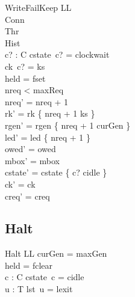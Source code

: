 \documentclass[a4paper,10pt,fleqn]{article}
\begin{document}
\begin{schema}{WriteFailKeep}
  \Delta LL \\
  \Xi Conn \\
  \Xi Thr \\
  \Xi Hist \\
  c? : C
\where
  cstate~c? = clockwait \\
  ck~c? = ks \\
  held = fset \\
  nreq < maxReq \\
  nreq' = nreq + 1 \\
  rk' = rk \oplus \{ nreq + 1 \mapsto ks \} \\
  rgen' = rgen \oplus \{ nreq + 1 \mapsto curGen \} \\
  led' = led \cup \{ nreq + 1 \} \\
  owed' = owed \\
  mbox' = mbox \\
  cstate' = cstate \oplus \{ c? \mapsto cidle \} \\
  ck' = ck \\
  creq' = creq
\end{schema}

\subsection{Halt}

\begin{schema}{Halt}
  \Xi LL
\where
  curGen = maxGen \\
  held = fclear \\
  \forall c : C \spot cstate~c = cidle \\
  \forall u : T \spot lst~u = lexit
\end{schema}
\end{document}

